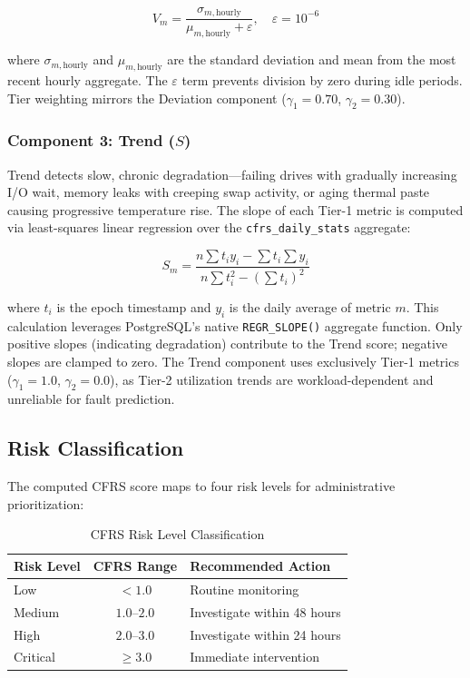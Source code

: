 \documentclass{ieeeaccess}
\begin{document}
\begin{equation}
V_m = \frac{\sigma_{m,\text{hourly}}}{\mu_{m,\text{hourly}} + \varepsilon}, \quad \varepsilon = 10^{-6}
\label{eq:variance}
\end{equation}

where $\sigma_{m,\text{hourly}}$ and $\mu_{m,\text{hourly}}$ are the standard deviation and mean from the most recent hourly aggregate. The $\varepsilon$ term prevents division by zero during idle periods. Tier weighting mirrors the Deviation component ($\gamma_1 = 0.70$, $\gamma_2 = 0.30$).

\subsubsection{Component 3: Trend ($S$)}
Trend detects slow, chronic degradation---failing drives with gradually increasing I/O wait, memory leaks with creeping swap activity, or aging thermal paste causing progressive temperature rise. The slope of each Tier-1 metric is computed via least-squares linear regression over the \texttt{cfrs\_daily\_stats} aggregate:

\begin{equation}
S_m = \frac{n \sum t_i y_i - \sum t_i \sum y_i}{n \sum t_i^2 - \left(\sum t_i\right)^2}
\label{eq:trend}
\end{equation}

where $t_i$ is the epoch timestamp and $y_i$ is the daily average of metric $m$. This calculation leverages PostgreSQL's native \texttt{REGR\_SLOPE()} aggregate function. Only positive slopes (indicating degradation) contribute to the Trend score; negative slopes are clamped to zero. The Trend component uses exclusively Tier-1 metrics ($\gamma_1 = 1.0$, $\gamma_2 = 0.0$), as Tier-2 utilization trends are workload-dependent and unreliable for fault prediction.

\subsection{Risk Classification}
The computed CFRS score maps to four risk levels for administrative prioritization:

\begin{table}[h]
\centering
\caption{CFRS Risk Level Classification}
\label{tab:risk_levels}
\begin{tabular}{l c l}
\hline
\textbf{Risk Level} & \textbf{CFRS Range} & \textbf{Recommended Action} \\
\hline
Low & $< 1.0$ & Routine monitoring \\
Medium & $1.0$--$2.0$ & Investigate within 48 hours \\
High & $2.0$--$3.0$ & Investigate within 24 hours \\
Critical & $\geq 3.0$ & Immediate intervention \\
\hline
\end{tabular}
\end{table}
\end{document}
